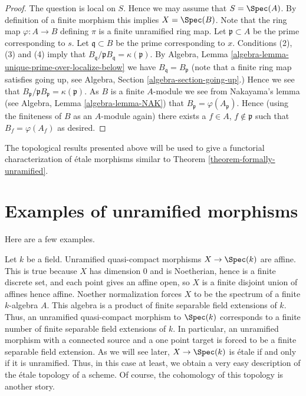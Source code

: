 \begin{proof}
The question is local on $S$. Hence we may assume that $S = \Spec(A)$.
By definition of a finite morphism this implies $X = \Spec(B)$.
Note that the ring map $\varphi : A \to B$ defining $\pi$
is a finite unramified ring map.
Let $\mathfrak p \subset A$ be the prime corresponding to $s$.
Let $\mathfrak q \subset B$ be the prime corresponding to $x$.
Conditions (2), (3) and (4) imply that
$B_{\mathfrak q}/\mathfrak pB_{\mathfrak q} = \kappa(\mathfrak p)$.
By Algebra, Lemma \ref{algebra-lemma-unique-prime-over-localize-below}
we have $B_{\mathfrak q} = B_{\mathfrak p}$
(note that a finite ring map satisfies going up, see
Algebra, Section \ref{algebra-section-going-up}.)
Hence we see that
$B_{\mathfrak p}/\mathfrak pB_{\mathfrak p} = \kappa(\mathfrak p)$.
As $B$ is a finite $A$-module we see from Nakayama's lemma (see
Algebra, Lemma \ref{algebra-lemma-NAK})
that $B_{\mathfrak p} = \varphi(A_{\mathfrak p})$. Hence (using the finiteness
of $B$ as an $A$-module again) there exists a
$f \in A$, $f \not \in \mathfrak p$ such that $B_f = \varphi(A_f)$
as desired.
\end{proof}

\noindent
The topological results presented above will be used to give a functorial
characterization of \'etale morphisms similar to Theorem
\ref{theorem-formally-unramified}.




\section{Examples of unramified morphisms}
\label{section-examples}

\noindent
Here are a few examples.

\begin{example}
\label{example-etale-field-extensions}
Let $k$ be a field.
Unramified quasi-compact morphisms $X \to \Spec(k)$ are affine.
This is true because $X$ has dimension $0$ and is Noetherian,
hence is a finite discrete set, and each point gives an affine open,
so $X$ is a finite disjoint union of affines hence affine.
Noether normalization forces $X$ to be the spectrum of a finite
$k$-algebra $A$.
This algebra is a product of finite separable field extensions of $k$.
Thus, an unramified quasi-compact morphism to $\Spec(k)$
corresponds to a finite number of finite separable field extensions of $k$.
In particular, an unramified morphism with a connected source and a one point
target is forced to be a finite separable field extension.
As we will see later, $X \to \Spec(k)$ is \'etale if and
only if it is unramified. Thus, in this case at least, we obtain a very easy
description of the \'etale topology of a scheme. Of course, the cohomology of
this topology is another story.
\end{example}

